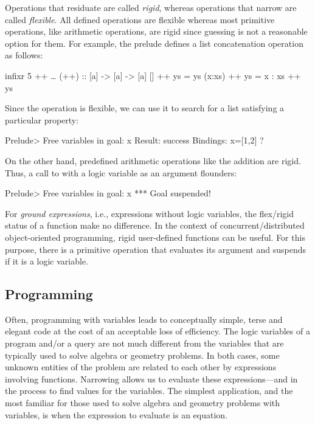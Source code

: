 Operations that residuate are called
\emph{rigid},
whereas operations that narrow are called
\emph{flexible}.
All defined operations are flexible
whereas most primitive operations,
like arithmetic operations, are rigid since guessing is not
a reasonable option for them.
For example, the prelude defines a list concatenation
operation as follows:
%
\begin{prog}
infixr 5 ++
\ldots
(++)          :: [a] -> [a] -> [a]
[]     ++ ys  = ys
(x:xs) ++ ys  = x : xs ++ ys
\end{prog}
%
Since the operation \ccode{++} is flexible, we can use it to search for
a list satisfying a particular property:
%
\begin{prog}
Prelude> 
Free variables in goal: x
Result: success
Bindings: 
x=[1,2] ?
\end{prog}
%
On the other hand, predefined arithmetic operations like the addition \ccode{+}
are rigid. Thus, a call to \ccode{+} with a logic variable as an argument
flounders:
%
\begin{prog}
Prelude> 
Free variables in goal: x
*** Goal suspended!
\end{prog}
%
For \emph{ground expressions},
i.e., expressions without logic variables, the flex/rigid status of
a function make no difference.
In the context of concurrent/distributed object-oriented programming,
rigid user-defined functions can be useful.
For this purpose, there is a primitive operation
that evaluates its argument and suspends if it is a logic variable.


\subsection{Programming}

Often, programming with variables leads
to conceptually simple, terse and elegant code
at the cost of an acceptable loss of efficiency.
The logic variables of a program and/or a query
are not much different from the variables that are typically
used to solve algebra or geometry problems.
In both cases, some unknown entities of the problem
are related to each other by expressions involving functions.
Narrowing allows us to evaluate these expressions---and
in the process to find values for the variables.
The simplest application, and the most familiar for
those used to solve algebra and geometry problems with variables,
is when the expression to evaluate is an equation.

